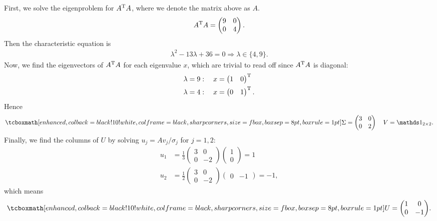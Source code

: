 First, we solve the eigenproblem for $A^{\rm T}A$, where we denote the matrix above as $A$.
\begin{eqnarray}
    \label{eq:AT-A_6}
    A^{\rm T}A = \begin{pmatrix}9 & 0\\0 & 4\end{pmatrix} 
.\end{eqnarray}
Then the characteristic equation is
\begin{eqnarray}
    \label{eq:char-eq_6}
    \lambda^{2} - 13 \lambda + 36 = 0 \Rightarrow \lambda \in \{4,9\}
.\end{eqnarray}
Now, we find the eigenvectors of $A^{\rm T}A$ for each eigenvalue $x$, which are trivial to read off since $A^{\rm T}A$ is diagonal:
\begin{align}
    \label{eq:corresponding-eigvec_6}
    &\lambda = 9: \quad x = \begin{pmatrix} 1 & 0 \end{pmatrix}^{\rm T} \\
    &\lambda = 4: \quad x = \begin{pmatrix} 0 & 1 \end{pmatrix}^{\rm T}
.\end{align}
Hence
\begin{eqnarray}
    \label{eq:Sig-V_6}
    \eqbox{
    \Sigma = \begin{pmatrix}
        3 & 0 \\
        0 & 2 
    \end{pmatrix}
    \quad
    V = \id_{2 \times 2} 
}
.\end{eqnarray}
Finally, we find the columns of $U$ by solving $u_{j} = Av_{j}/\sigma_{j}$ for $j = 1,2$:
\begin{align}
    \label{eq:U-vecs_6}
    u_{1} &= \frac{1}{3}\begin{pmatrix}
        3 & 0 \\
        0 & -2 
    \end{pmatrix}
    \begin{pmatrix}
    1 \\ 0
    \end{pmatrix}
    = 1  \\
    u_{2} &= \frac{1}{2}\begin{pmatrix}
        3 & 0 \\
        0 & -2
    \end{pmatrix}
    \begin{pmatrix}
    0 & -1   
    \end{pmatrix}
    = -1
,\end{align}
which means
\begin{eqnarray}
    \label{eq:U_6}
    \eqbox{
    U = \begin{pmatrix}
        1 & 0 \\
        0 & -1
    \end{pmatrix}
}
.\end{eqnarray}

